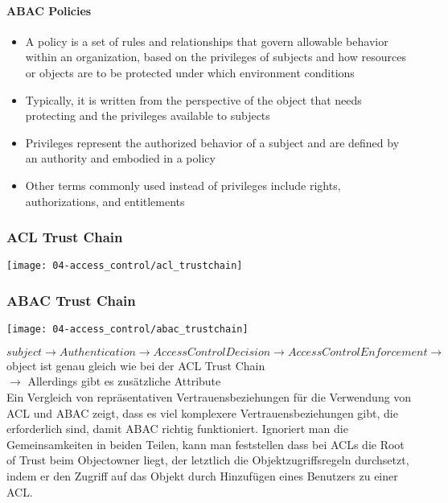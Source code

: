 \paragraph{ABAC Policies}
\begin{itemize}
    \item A policy is a set of rules and relationships that govern allowable behavior within an organization, based on the privileges of subjects and how resources or objects are to be protected under which environment conditions
    \item Typically, it is written from the perspective of the object that needs protecting and the privileges available to subjects
    \item Privileges represent the authorized behavior of a subject and are defined by an authority and embodied in a policy
    \item Other terms commonly used instead of privileges include rights, authorizations, and entitlements
\end{itemize}

\newpage

\subsubsection{ACL Trust Chain}
\begin{center}
    \texttt{[image: 04-access\_control/acl\_trustchain]}
    \vspace{-8pt}
\end{center}

\subsubsection{ABAC Trust Chain}
\begin{center}
    \texttt{[image: 04-access\_control/abac\_trustchain]}
    \vspace{-8pt}
\end{center}

$subject \rightarrow Authentication \rightarrow Access Control Decision \rightarrow Access Control Enforcement \rightarrow$ object ist genau gleich wie bei der ACL Trust Chain\\
$\rightarrow$ Allerdings gibt es zusätzliche Attribute\\

Ein Vergleich von repräsentativen Vertrauensbeziehungen für die Verwendung von ACL und ABAC zeigt, dass es viel komplexere Vertrauensbeziehungen gibt, die erforderlich sind, damit ABAC richtig funktioniert. Ignoriert man die Gemeinsamkeiten in beiden Teilen, kann man feststellen dass bei ACLs die Root of Trust beim Objectowner liegt, der letztlich die Objektzugriffsregeln durchsetzt, indem er den Zugriff auf das Objekt durch Hinzufügen eines Benutzers zu einer ACL. 

